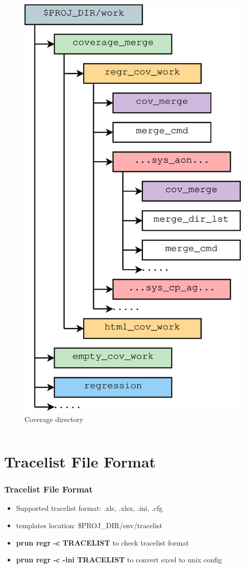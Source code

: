 \documentclass{beamer}
\begin{document}
\begin{frame}
\begin{columns}[c]
    \begin{figure}
      \centering
      \includegraphics[width=0.57\linewidth]{dir_cov_hier}
      \caption{Coverage directory}
    \end{figure}

  \end{columns}
\end{frame}

\section{Tracelist File Format}

\begin{frame}
  \frametitle{Tracelist File Format}
  \begin{itemize}
  \item Supported tracelist format: .xls, .xlsx, .ini, .cfg
  \item templates location: \$PROJ\_DIR/env/tracelist
  \item \textbf{prun regr -c TRACELIST} to check tracelist format
  \item \textbf{prun regr -c -ini TRACELIST} to convert excel to unix config
  \end{itemize}
\end{frame}
\end{document}
